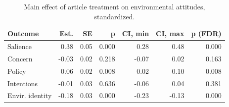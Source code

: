 \begin{table}[h!t]
\centering
\begin{tabular}{lrrrrrr}
  \hline
Outcome & Est. & SE & p & CI, min & CI, max & p (FDR) \\ 
  \hline
Salience & 0.38 & 0.05 & 0.000 & 0.28 & 0.48 & 0.000 \\ 
  Concern & -0.03 & 0.02 & 0.218 & -0.07 & 0.02 & 0.163 \\ 
  Policy & 0.06 & 0.02 & 0.008 & 0.02 & 0.10 & 0.008 \\ 
  Intentions & -0.01 & 0.03 & 0.636 & -0.06 & 0.04 & 0.381 \\ 
  Envir. identity & -0.18 & 0.03 & 0.000 & -0.23 & -0.13 & 0.000 \\ 
   \hline
\end{tabular}
\caption{Main effect of article treatment on environmental attitudes, standardized.} 
\label{tab:main_stand}
\end{table}
